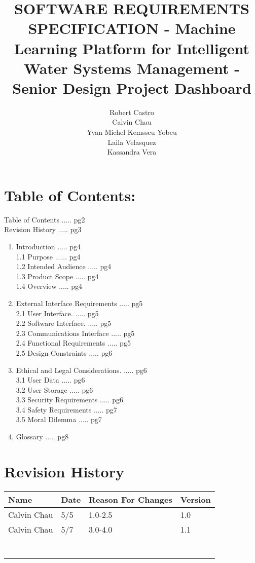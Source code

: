 \documentclass[10pt]{article}
\title{SOFTWARE REQUIREMENTS SPECIFICATION - Machine Learning Platform for Intelligent Water Systems Management - Senior Design Project Dashboard  }
\author{Robert Castro\\
Calvin Chau\\
Yvan Michel Kemsseu Yobeu\\
Laila Velasquez\\
Kassandra Vera}
\date{}
\begin{document}
\maketitle
\newpage

\section*{Table of Contents:}
Table of Contents ..... pg2\\
Revision History ..... pg3

\begin{enumerate}
  \item Introduction ..... pg4\\
1.1 Purpose ...... pg4\\
1.2 Intended Audience ..... pg4\\
1.3 Product Scope ..... pg4\\
1.4 Overview ..... pg4
  \item External Interface Requirements ..... pg5\\
2.1 User Interface. ..... pg5\\
2.2 Software Interface. ..... pg5\\
2.3 Communications Interface ..... pg5\\
2.4 Functional Requirements ..... pg5\\
2.5 Design Constraints ..... pg6
  \item Ethical and Legal Considerations. ..... pg6\\
3.1 User Data ..... pg6\\
3.2 User Storage ..... pg6\\
3.3 Security Requirements ..... pg6\\
3.4 Safety Requirements ..... pg7\\
3.5 Moral Dilemma ..... pg7
\item Glossary ..... pg8
\end{enumerate}
\newpage

\section*{Revision History}
\begin{center}
\begin{tabular}{|l|l|l|l|}
\hline
Name & Date & Reason For Changes & Version \\
\hline
Calvin Chau & 5/5 & 1.0-2.5 & 1.0 \\
\hline
Calvin Chau & 5/7 & 3.0-4.0 & 1.1 \\
\hline
 &  &  &  \\
\hline
 &  &  &  \\
\hline
 &  &  &  \\
\hline
 &  &  &  \\
\hline
 &  &  &  \\
\hline
 &  &  &  \\
\hline
 &  &  &  \\
\hline
\end{tabular}
\end{center}
\newpage
\end{document}
